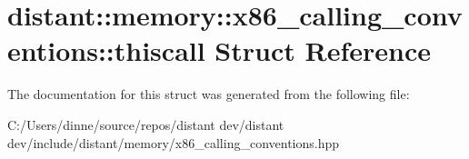 \hypertarget{structdistant_1_1memory_1_1x86__calling__conventions_1_1thiscall}{}\section{distant\+:\+:memory\+:\+:x86\+\_\+calling\+\_\+conventions\+:\+:thiscall Struct Reference}
\label{structdistant_1_1memory_1_1x86__calling__conventions_1_1thiscall}


The documentation for this struct was generated from the following file\+:\begin{DoxyCompactItemize}
\item 
C\+:/\+Users/dinne/source/repos/distant dev/distant dev/include/distant/memory/x86\+\_\+calling\+\_\+conventions.\+hpp\end{DoxyCompactItemize}
